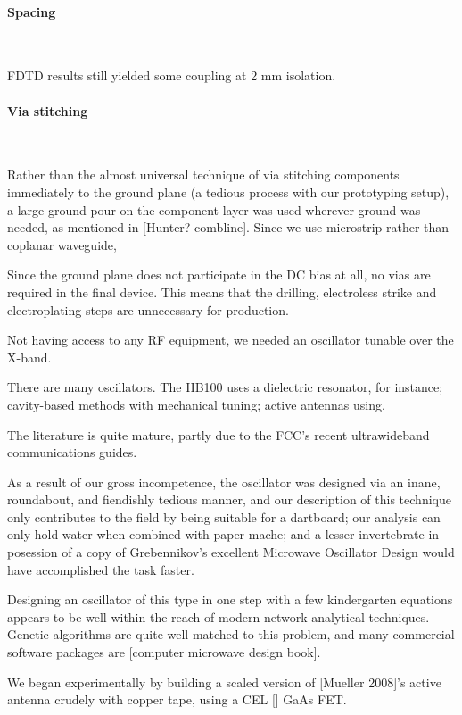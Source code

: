 \documentclass[paper.tex]{subfiles}
\begin{document}
\paragraph{\textbf{Spacing}}\

FDTD results still yielded some coupling at 2 mm isolation.

\paragraph{\textbf{Via stitching}}\

Rather than the almost universal technique of via stitching components immediately to the ground plane (a tedious process with our prototyping setup), a large ground pour on the component layer was used wherever ground was needed, as mentioned in [Hunter? combline]. Since we use microstrip rather than coplanar waveguide, 

Since the ground plane does not participate in the DC bias at all, no vias are required in the final device. This means that the drilling, electroless strike and electroplating steps are unnecessary for production.



Not having access to any RF equipment, we needed an oscillator tunable over the X-band.

There are many oscillators. The HB100 uses a dielectric resonator, for instance; cavity-based methods with mechanical tuning; active antennas using. 


The literature is quite mature, partly due to the FCC's recent ultrawideband communications guides.

As a result of our gross incompetence, the oscillator was designed via an inane, roundabout, and fiendishly tedious manner, and our description of this technique only contributes to the field by being suitable for a dartboard; our analysis can only hold water when combined with paper mache; and a lesser invertebrate in posession of a copy of Grebennikov's excellent Microwave Oscillator Design would have accomplished the task faster.


Designing an oscillator of this type in one step with a few kindergarten equations appears to be well within the reach of modern network analytical techniques. Genetic algorithms are quite well matched to this problem, and many commercial software packages are  [computer microwave design book]. 


We began experimentally by building a scaled version of [Mueller 2008]'s active antenna crudely with copper tape, using a CEL [] GaAs FET.
\end{document}
